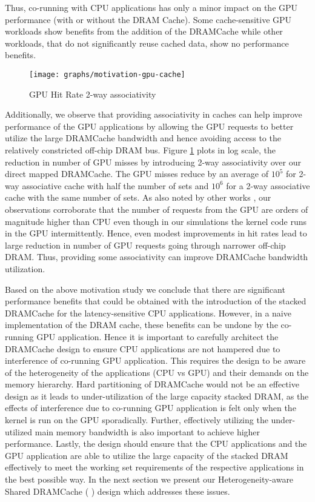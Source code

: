 Thus,  co-running with CPU applications has only a minor impact on the GPU performance (with or without the DRAM Cache). 
Some cache-sensitive GPU workloads show benefits from the addition of the DRAMCache while other workloads, that do not significantly reuse cached data, show no performance benefits.
\begin{figure}[htb]
   \texttt{[image: graphs/motivation-gpu-cache]}
   \caption{GPU Hit Rate 2-way associativity}
   \label{fig:motivation-gpu-cache}
\end{figure}
\par Additionally, we observe that providing associativity in caches can help improve performance of the GPU applications by allowing the GPU requests to better utilize the large  DRAMCache bandwidth and hence avoiding access to the relatively constricted off-chip DRAM bus. Figure \ref{fig:motivation-gpu-cache} plots in log scale, the reduction in number of GPU misses by introducing 2-way associativity over our direct mapped DRAMCache. The GPU misses reduce by an average of $10^5$ for 2-way associative cache with half the number of sets and $10^6$ for a 2-way associative cache with the same number of sets. As also noted by other works \cite{oscar}, our observations corroborate that the number of requests from the GPU are orders of magnitude higher than CPU even though in our simulations the kernel code runs in the GPU intermittently. Hence, even modest improvements in hit rates lead to large reduction in number of GPU requests going through narrower off-chip DRAM. Thus, providing some associativity can improve DRAMCache bandwidth utilization.
\par Based on the above motivation study we conclude that there are significant performance benefits that could be obtained 
with the introduction of the stacked DRAMCache for the latency-sensitive CPU applications. However, in a naive implementation
of the DRAM cache, these benefits can be undone by the co-running GPU application.  Hence it is important to carefully 
architect the DRAMCache design to ensure CPU applications are not hampered due to interference of co-running GPU application.
This requires the design to be aware of the heterogeneity of the applications (CPU vs GPU) and their demands on the 
memory hierarchy.  Hard partitioning of DRAMCache would not be an effective design as it leads to under-utilization of the large capacity 
stacked DRAM, as the effects of interference due to co-running GPU application is felt only when the kernel is run on the GPU sporadically. 
Further, effectively utilizing the under-utilized main memory bandwidth \cite{micro-refresh, mainak-hpca, bear}
is also important to achieve higher performance.  Lastly, the design should ensure that the CPU applications and the 
GPU application are able to utilize the large capacity of the stacked DRAM effectively to meet the working set 
requirements of the respective applications in the best possible way. In the next section we present our Heterogeneity-aware Shared DRAMCache ( \cachename) design which addresses these issues.
